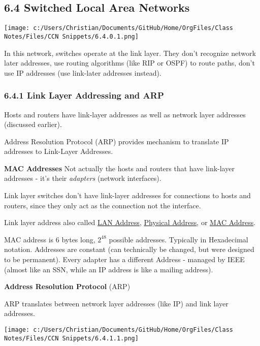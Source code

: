 \documentclass[11pt]{article}
\begin{document}
\subsection{6.4 Switched Local Area Networks}
\label{sec:org23d3c85}
\begin{figure*}
\centering
\texttt{[image: c:/Users/Christian/Documents/GitHub/Home/OrgFiles/Class Notes/Files/CCN Snippets/6.4.0.1.png]}
\end{figure*}

In this network, switches operate at the link layer.
They don't recognize network later addresses, use routing algorithms (like RIP or OSPF) to route paths, don't use IP addresses (use link-later addresses instead).

\subsubsection{6.4.1 Link Layer Addressing and ARP}
\label{sec:org29ba1fd}
Hosts and routers have link-layer addresses as well as network layer addresses (discussed earlier).

Address Resolution Protocol (ARP) provides mechanism to translate IP addresses to Link-Layer Addresses.

\textbf{MAC Addresses}
Not actually the hosts and routers that have link-layer addresses - it's their \emph{adapters} (network interfaces).

Link layer switches don't have link-layer addresses for connections to hosts and routers, since they only act as the connection not the interface.

Link layer address also called \uline{LAN Address}, \uline{Physical Address}, or \uline{MAC Address}.

MAC address is 6 bytes long, \(2^{48}\) possible addresses. Typically in Hexadecimal notation.
Addresses are constant (can technically be changed, but were designed to be permanent).
Every adapter has a different Address - managed by IEEE (almost like an SSN, while an IP address is like a mailing address).

\textbf{Address Resolution Protocol} (ARP)

ARP translates between network layer addresses (like IP) and link layer addresses.
\begin{figure*}
\centering
\texttt{[image: c:/Users/Christian/Documents/GitHub/Home/OrgFiles/Class Notes/Files/CCN Snippets/6.4.1.1.png]}
\end{figure*}
\end{document}
